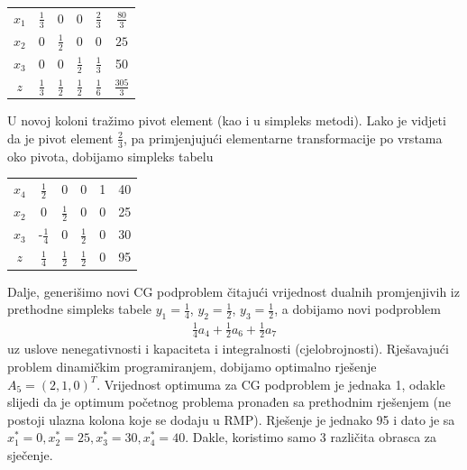 \documentclass[b5paper, utf8, 11pt, colorlinks]{book}
\theoremstyle{definition}
\begin{document}
\begin{center}
	
	\begin{tabular}{ccccc|c}
		$x_1$ &     $\frac{1}{3}$  &   0 & 0  &      $ \frac{2}{3}$           & $\frac{80}{3}$ \\
		$x_2$ &     0              &  $\frac{1}{2}$  & 0     & 0                 &     $25$ \\
		$x_3$ &     0              &  0    &  $\frac{1}{2}$  & $ \frac{1}{3}$    & 50 \\ \hline
		$z$   &  $\frac{1}{3}$     &  $\frac{1}{2}$   &  $\frac{1}{2}$ &   $\frac{1}{6}$   & $\frac{305}{3}$ 
	\end{tabular}
\end{center}
U novoj koloni tražimo pivot element (kao i u simpleks metodi). Lako je vidjeti da je pivot element $\frac{2}{3}$, pa primjenjujući elementarne transformacije po vrstama oko pivota, dobijamo simpleks tabelu
\begin{center}
	\begin{tabular}{ccccc| c}
		  $x_4$ & $\frac{1}{2}$ & 0 & 0 & 1 & 40 \\
		  $x_2$ & 0 & $\frac{1}{2}$ & 0 & 0 & 25 \\
		  $x_3$ & -$\frac{1}{4}$ & 0 & $\frac{1}{2}$ & 0 & 30 \\ \hline
		  $z$ & $\frac{1}{4}$ & $\frac{1}{2}$ & $\frac{1}{2}$ & 0 & 95 
	\end{tabular}
\end{center}

Dalje, generišimo novi CG podproblem čitajući vrijednost dualnih promjenjivih iz prethodne simpleks tabele $y_1 = \frac{1}{4}$, $y_2 = \frac{1}{2}$, $y_3= \frac{1}{2}$, a dobijamo novi podproblem
\begin{align*}
	 \frac{1}{4} a_4 + \frac{1}{2} a_6 + \frac{1}{2} a_7
\end{align*}
uz uslove nenegativnosti i kapaciteta i integralnosti (cjelobrojnosti). Rješavajući problem dinamičkim programiranjem, dobijamo optimalno rješenje $A_5 = (2,1,0)^T$. Vrijednost optimuma za CG podproblem je jednaka 1, odakle slijedi da je optimum početnog problema pronađen sa prethodnim rješenjem (ne postoji ulazna kolona koje se dodaju u RMP). Rješenje je jednako 95 i dato je sa $x_1^* = 0, x_2^* = 25, x_3^*=30, x_4^*= 40$. Dakle, koristimo samo 3 različita obrasca za sječenje. 
\end{document}

